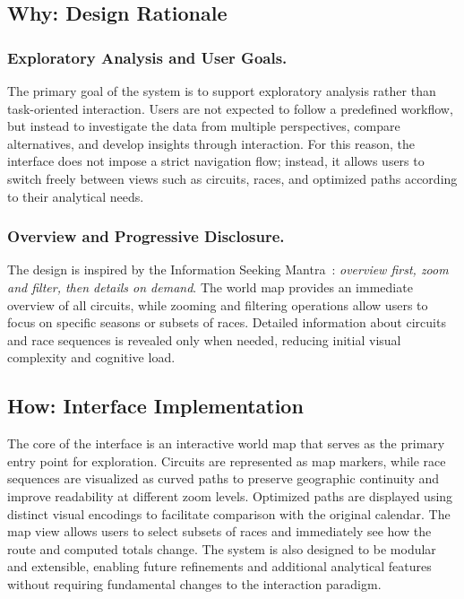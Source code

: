 \documentclass{egpubl}
\begin{document}
\subsection{Why: Design Rationale}

\subsubsection{Exploratory Analysis and User Goals.}
The primary goal of the system is to support exploratory analysis rather than task-oriented interaction. Users are not expected to follow a predefined workflow, but instead to investigate the data from multiple perspectives, compare alternatives, and develop insights through interaction. For this reason, the interface does not impose a strict navigation flow; instead, it allows users to switch freely between views such as circuits, races, and optimized paths according to their analytical needs.

\subsubsection{Overview and Progressive Disclosure.}
The design is inspired by the Information Seeking Mantra~\cite{InformationSeeking}: \emph{overview first, zoom and filter, then details on demand}. The world map provides an immediate overview of all circuits, while zooming and filtering operations allow users to focus on specific seasons or subsets of races. Detailed information about circuits and race sequences is revealed only when needed, reducing initial visual complexity and cognitive load.

\subsection{How: Interface Implementation}

The core of the interface is an interactive world map that serves as the primary entry point for exploration. Circuits are represented as map markers, while race sequences are visualized as curved paths to preserve geographic continuity and improve readability at different zoom levels. Optimized paths are displayed using distinct visual encodings to facilitate comparison with the original calendar. The map view allows users to select subsets of races and immediately see how the route and computed totals change.
The system is also designed to be modular and extensible, enabling future refinements and additional analytical features without requiring fundamental changes to the interaction paradigm.
\end{document}
